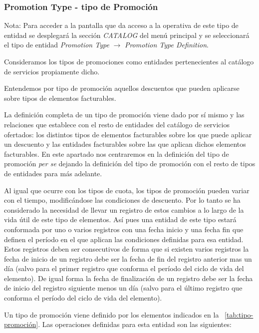 \subsubsection{Promotion Type - tipo de Promoción}
\label{sub:promotion-type}

Nota: Para acceder a la pantalla que da acceso a la operativa de este tipo de entidad se desplegará la sección \emph{CATALOG} del menú principal y se seleccionará el tipo de entidad \emph{Promotion Type} $\rightarrow$  \emph{Promotion Type Definition}.

Consideramos los tipos de promociones como entidades pertenecientes al catálogo de servicios propiamente dicho.

Entendemos por tipo de promoción aquellos descuentos que pueden aplicarse sobre tipos de elementos facturables.

La definición completa de un tipo de promoción viene dado por sí mismo y las relaciones que establece con el resto de entidades del catálogo de servicios ofertados: los distintos tipos de elementos facturables sobre los que puede aplicar un descuento y las entidades facturables sobre las que aplican dichos elementos facturables.  En este apartado nos centraremos en la definición del tipo de promoción \textit{per se} dejando la definición del tipo de promoción con el resto de tipos de entidades para más adelante.

Al igual que ocurre con los tipos de cuota, los tipos de promoción pueden variar con el tiempo, modificándose las condiciones de descuento. Por lo tanto se ha considerado la necesidad de llevar un registro de estos cambios a lo largo de la vida útil de este tipo de elementos. Así pues una entidad de este tipo estará conformada por uno o varios registros con una fecha inicio y una fecha fin que definen el período en el que aplican las condiciones definidas para esa entidad. Estos registros deben ser consecutivos de forma que si existen varios registros la fecha de inicio de un registro debe ser la fecha de fin del registro anterior mas un día (salvo para el primer registro que conforma el período del ciclo de vida del elemento). De igual forma la fecha de finalización de un registro debe ser la fecha de inicio del registro siguiente menos un día (salvo para el último registro que conforma el período del ciclo de vida del elemento).


Un tipo de promoción viene definido por los elementos indicados en la \tablename~\ref{tab:tipo-promoción}.
Las operaciones definidas para esta entidad son las siguientes:

